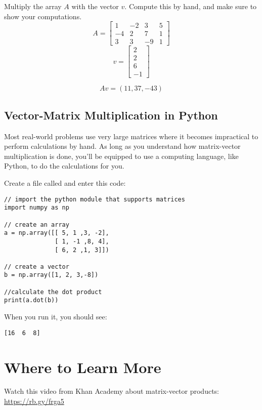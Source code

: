 \begin{Exercise}[title={Vector Matrix Multiplication}, label=vector-matrix-multiply01]
Multiply the array $A$ with the vector $v$. Compute this by hand, and make sure to show your computations. 
$$A = \begin{bmatrix}
1 &-2  &3 &5  \\
-4  &2  &7 &1 \\
3  &3  &-9 &1
\end{bmatrix}$$
	$$v = 
	\begin{bmatrix}
		2 \\
 		2 \\
 		6 \\
 		-1
	\end{bmatrix}$$
\end{Exercise}
\begin{Answer}[ref=vector-matrix-multiply01]
$$Av = (11, 37, -43)$$
\end{Answer}

\subsection{Vector-Matrix Multiplication in Python}
Most real-world problems use very large matrices where it becomes impractical to perform calculations by hand. As long as you understand how matrix-vector multiplication is done, you'll be equipped to use a computing language, like Python, to do the calculations for you. 

Create a file called  and enter this code:

\begin{Verbatim}
// import the python module that supports matrices
import numpy as np

// create an array
a = np.array([[ 5, 1 ,3, -2], 
              [ 1, -1 ,8, 4], 
              [ 6, 2 ,1, 3]])

// create a vector 
b = np.array([1, 2, 3,-8])

//calculate the dot product
print(a.dot(b))
\end{Verbatim}

When you run it, you should see:
\begin{Verbatim}
[16  6  8]
\end{Verbatim}

\section{Where to Learn More}
Watch this video from Khan Academy about matrix-vector products: \url{https://rb.gy/frga5}

